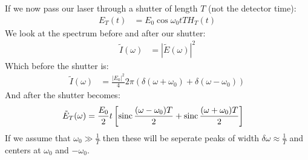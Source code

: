 If we now pass our laser through a shutter of length $T$ (not the detector time):
\begin{align*}
	E_T(t)&= E_0 \cos \omega_0 t TH_T(t)
\end{align*}
We look at the spectrum before and after our shutter:
\begin{align*}
	\tilde{I}(\omega) &= |\tilde{E}(\omega)|^2
\end{align*}
Which before the shutter is:
\begin{align*}
	\tilde{I}(\omega) &= \frac{|E_0|^2}{4} 2\pi\left(\delta(\omega + \omega_0) + \delta(\omega - \omega_0)\right)
\end{align*}
And after the shutter becomes:
\begin{align*}
	\tilde{E}_T(\omega) &= \frac{E_0}{2} t\left[\operatorname{sinc}\frac{(\omega - \omega_0)T}{2} + \operatorname{sinc}\frac{(\omega + \omega_0)T}{2}\right]
\end{align*}
If we assume that $\omega_0 \gg \frac{1}{T}$ then these will be seperate peaks of width $\delta\omega\approx\frac{1}{T}$ and centers at $\omega_0$ and $-\omega_0$.

